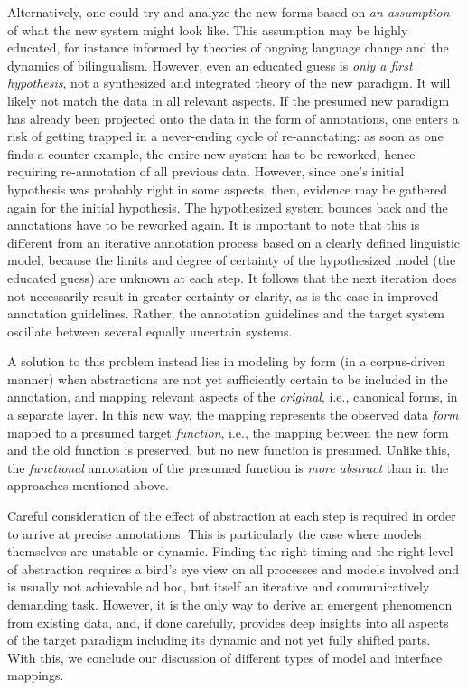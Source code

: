 \documentclass[output=paper,colorlinks,citecolor=brown]{langscibook}
\begin{document}
Alternatively, one could try and analyze the new forms based on \textit{an assumption} of what the new system might look like. This assumption may be highly educated, for instance informed by theories of ongoing language change and the dynamics of bilingualism. 
However, even an educated guess is \textit{only a first hypothesis}, not a synthesized and integrated theory of the new paradigm. It will likely not match the data in all relevant aspects. If the presumed new paradigm has already been projected onto the data in the form of annotations, one enters a risk of getting trapped in a never-ending cycle of re-annotating: as soon as one finds a counter-example, the entire new system has to be reworked, hence requiring re-annotation of all previous data. However, since one's initial hypothesis was probably right in some aspects, then, evidence may be gathered again for the initial hypothesis. The hypothesized system bounces back and the annotations have to be reworked again. It is important to note that this is different from an iterative annotation process based on a clearly defined linguistic model, because the limits and degree of certainty of the hypothesized model (the educated guess) are unknown at each step. It follows that the next iteration does not necessarily result in greater certainty or clarity, as is the case in improved annotation guidelines. Rather, the annotation guidelines and the target system oscillate between several equally uncertain systems.

A solution to this problem instead lies in modeling by form (in a corpus-driven manner) when abstractions are not yet sufficiently certain to be included in the annotation, and mapping relevant aspects of the \textit{original}, i.e., canonical forms, in a separate layer. In this new way, the mapping represents the observed data \textit{form} mapped to a presumed target \textit{function}, i.e., the mapping between the new form and the old function is preserved, but no new function is presumed. Unlike this, the \textit{functional} annotation of the presumed function is \textit{more abstract} than in the approaches mentioned above.

Careful consideration of the effect of abstraction at each step is required in order to arrive at precise annotations. This is particularly the case where models themselves are unstable or dynamic.  Finding the right timing and the right level of abstraction requires a bird's eye view on all processes and models involved and is usually not achievable ad hoc, but itself an iterative and communicatively demanding task. However, it is the only way to derive an emergent phenomenon from existing data, and, if done carefully, provides deep insights into all aspects of the target paradigm including its dynamic and not yet fully shifted parts. With this, we conclude our discussion of different types of model and interface mappings.
\end{document}
